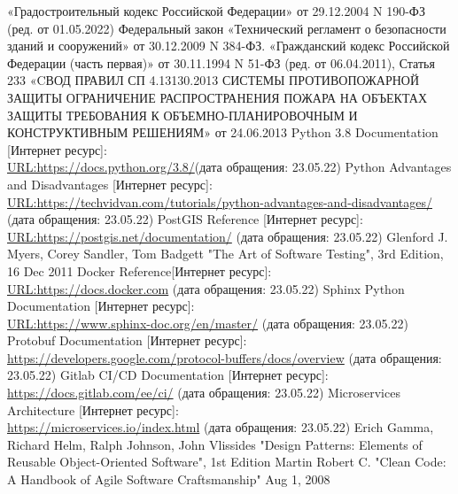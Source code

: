 
\begin{thebibliography}{8}
	«Градостроительный кодекс Российской Федерации» от 29.12.2004 N 190-ФЗ (ред. от 01.05.2022)
	Федеральный закон «Технический регламент о безопасности зданий и сооружений» от 30.12.2009 N 384-ФЗ.
	«Гражданский кодекс Российской Федерации (часть первая)» от 30.11.1994 N 51-ФЗ (ред. от 06.04.2011), Статья 233
	«CВОД ПРАВИЛ СП 4.13130.2013
	СИСТЕМЫ ПРОТИВОПОЖАРНОЙ ЗАЩИТЫ
	ОГРАНИЧЕНИЕ РАСПРОСТРАНЕНИЯ ПОЖАРА НА ОБЪЕКТАХ ЗАЩИТЫ
	ТРЕБОВАНИЯ
	К ОБЪЕМНО-ПЛАНИРОВОЧНЫМ И КОНСТРУКТИВНЫМ РЕШЕНИЯМ» от 24.06.2013
	 Python 3.8 Documentation [Интернет ресурс]:\\
	\url{URL:https://docs.python.org/3.8/}(дата обращения: 23.05.22)
	 Python Advantages and Disadvantages [Интернет ресурс]:\\
	\url{URL:https://techvidvan.com/tutorials/python-advantages-and-disadvantages/} (дата обращения: 23.05.22)
	 PostGIS Reference [Интернет ресурс]:\\
	\url{URL:https://postgis.net/documentation/} (дата обращения: 23.05.22)
	Glenford J. Myers, Corey Sandler, Tom Badgett "The Art of Software Testing", 3rd Edition, 16 Dec 2011
	 Docker Reference[Интернет ресурс]:\\
	\url{URL:https://docs.docker.com} (дата обращения: 23.05.22)
	 Sphinx Python Documentation [Интернет ресурс]:\\
	\url{URL:https://www.sphinx-doc.org/en/master/} (дата обращения: 23.05.22)
	 Protobuf Documentation [Интернет ресурс]:\\
	\url{https://developers.google.com/protocol-buffers/docs/overview} (дата обращения: 23.05.22)
	 Gitlab CI/CD Documentation [Интернет ресурс]:\\
	\url{https://docs.gitlab.com/ee/ci/} (дата обращения: 23.05.22)
	 Microservices Architecture [Интернет ресурс]:\\
	\url{https://microservices.io/index.html} (дата обращения: 23.05.22)
	Erich Gamma, Richard Helm, Ralph Johnson, John Vlissides
	"Design Patterns: Elements of Reusable Object-Oriented Software", 1st Edition
	Martin Robert C. "Clean Code: A Handbook of Agile Software Craftsmanship" Aug 1, 2008

\end{thebibliography}
